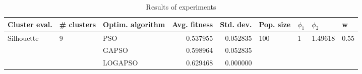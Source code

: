\begin{table}
\centering
\caption{Results of experiments}
\begin{tabular}{lllrrllll}
\toprule
              Cluster eval. &        \# clusters & Optim. algorithm &  Avg. fitness &  Std. dev. &            Pop. size &         $\phi_{1}$ &               $\phi_{2}$ &                     w \\
\midrule
\multirow{3}{*}{Silhouette} & \multirow{3}{*}{9} &              PSO &      0.537955 &   0.052835 & \multirow{3}{*}{100} & \multirow{3}{*}{1} & \multirow{3}{*}{1.49618} & \multirow{3}{*}{0.55} \\
                            &                    &            GAPSO &      0.598964 &   0.052835 &                      &                    &                          &                       \\
                            &                    &          LOGAPSO &      0.629468 &   0.000000 &                      &                    &                          &                       \\
\bottomrule
\end{tabular}
\end{table}

